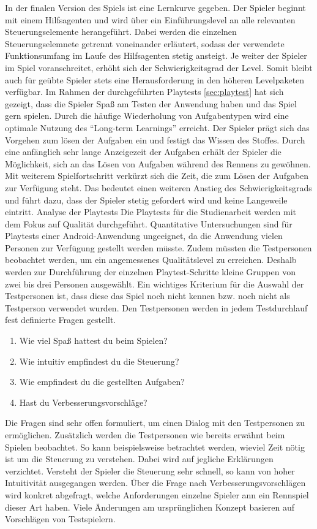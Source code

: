 In der finalen Version des Spiels ist eine Lernkurve gegeben. Der Spieler beginnt mit einem Hilfsagenten und wird über ein Einführungslevel an alle relevanten Steuerungselemente herangeführt. Dabei werden die einzelnen Steuerungselemnete getrennt voneinander erläutert, sodass der verwendete Funktionsumfang im Laufe des Hilfsagenten stetig ansteigt. Je weiter der Spieler im Spiel voranschreitet, erhöht sich der Schwierigkeitsgrad der Level. Somit bleibt auch für geübte Spieler stets eine Herausforderung in den höheren Levelpaketen verfügbar. Im Rahmen der durchgeführten Playtests \ref{sec:playtest} hat sich gezeigt, dass die Spieler Spaß am Testen der Anwendung haben und das Spiel gern spielen. Durch die häufige Wiederholung von Aufgabentypen wird eine optimale Nutzung des \enquote{Long-term Learnings} erreicht. Der Spieler prägt sich das Vorgehen zum lösen der Aufgaben ein und festigt das Wissen des Stoffes. Durch eine anfänglich sehr lange Anzeigezeit der Aufgaben erhält der Spieler die Möglichkeit, sich an das Lösen von Aufgaben während des Rennens zu gewöhnen. Mit weiterem Spielfortschritt verkürzt sich die Zeit, die zum Lösen der Aufgaben zur Verfügung steht. Das bedeutet einen weiteren Anstieg des Schwierigkeitsgrads und führt dazu, dass der Spieler stetig gefordert wird und keine Langeweile eintritt.
Analyse der Playtests
Die Playtests für die Studienarbeit werden mit dem Fokus auf Qualität durchgeführt. Quantitative Untersuchungen sind für Playtests einer Android-Anwendung ungeeignet, da die Anwendung vielen Personen zur Verfügung gestellt werden müsste. Zudem müssten die Testpersonen beobachtet werden, um ein angemessenes Qualitätslevel zu erreichen. Deshalb werden zur Durchführung der einzelnen Playtest-Schritte kleine Gruppen von zwei bis drei Personen ausgewählt. Ein wichtiges Kriterium für die Auswahl der Testpersonen ist, dass diese das Spiel noch nicht kennen bzw. noch nicht als Testperson verwendet wurden.
Den Testpersonen werden in jedem Testdurchlauf fest definierte Fragen gestellt.
\begin{enumerate}
    \item{Wie viel Spaß hattest du beim Spielen?}
    \item{Wie intuitiv empfindest du die Steuerung?}
    \item{Wie empfindest du die gestellten Aufgaben?}
    \item{Hast du Verbesserungsvorschläge?}
\end{enumerate}
Die Fragen sind sehr offen formuliert, um einen Dialog mit den Testpersonen zu ermöglichen. Zusätzlich werden die Testpersonen wie bereits erwähnt beim Spielen beobachtet. So kann beispielsweise betrachtet werden, wieviel Zeit nötig ist um die Steuerung zu verstehen. Dabei wird auf jegliche Erklärungen verzichtet. Versteht der Spieler die Steuerung sehr schnell, so kann von hoher Intuitivität ausgegangen werden. Über die Frage nach Verbesserungsvorschlägen wird konkret abgefragt, welche Anforderungen einzelne Spieler ann ein Rennspiel dieser Art haben. Viele Änderungen am ursprünglichen Konzept basieren auf Vorschlägen von Testspielern.
